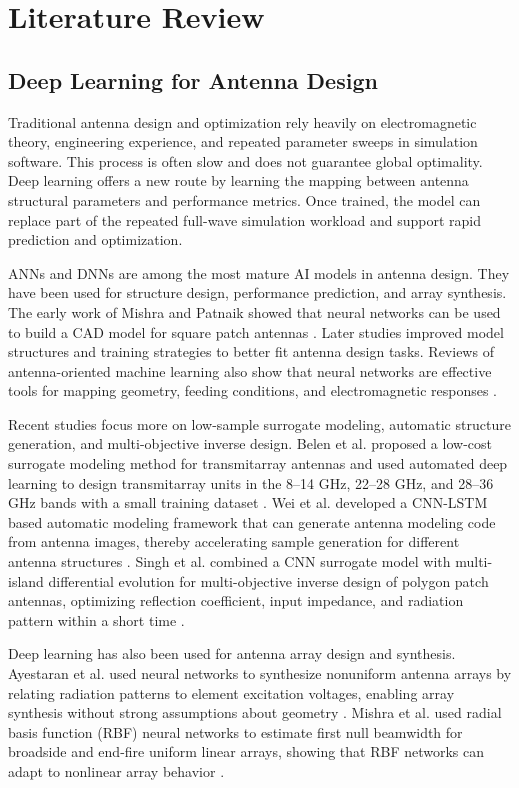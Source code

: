 \documentclass{article}
\begin{document}
\section{Literature Review}

\subsection{Deep Learning for Antenna Design}

Traditional antenna design and optimization rely heavily on electromagnetic theory, engineering experience, and repeated parameter sweeps in simulation software. This process is often slow and does not guarantee global optimality. Deep learning offers a new route by learning the mapping between antenna structural parameters and performance metrics. Once trained, the model can replace part of the repeated full-wave simulation workload and support rapid prediction and optimization.

ANNs and DNNs are among the most mature AI models in antenna design. They have been used for structure design, performance prediction, and array synthesis. The early work of Mishra and Patnaik showed that neural networks can be used to build a CAD model for square patch antennas \cite{mishra1998square}. Later studies improved model structures and training strategies to better fit antenna design tasks. Reviews of antenna-oriented machine learning also show that neural networks are effective tools for mapping geometry, feeding conditions, and electromagnetic responses \cite{misilmani2020review,feng2022ann}.

Recent studies focus more on low-sample surrogate modeling, automatic structure generation, and multi-objective inverse design. Belen et al. proposed a low-cost surrogate modeling method for transmitarray antennas and used automated deep learning to design transmitarray units in the 8--14 GHz, 22--28 GHz, and 28--36 GHz bands with a small training dataset \cite{belen2023transmitarray}. Wei et al. developed a CNN-LSTM based automatic modeling framework that can generate antenna modeling code from antenna images, thereby accelerating sample generation for different antenna structures \cite{wei2023cnn}. Singh et al. combined a CNN surrogate model with multi-island differential evolution for multi-objective inverse design of polygon patch antennas, optimizing reflection coefficient, input impedance, and radiation pattern within a short time \cite{singh2024polygon}.

Deep learning has also been used for antenna array design and synthesis. Ayestaran et al. used neural networks to synthesize nonuniform antenna arrays by relating radiation patterns to element excitation voltages, enabling array synthesis without strong assumptions about geometry \cite{ayestaran2007nonuniform}. Mishra et al. used radial basis function (RBF) neural networks to estimate first null beamwidth for broadside and end-fire uniform linear arrays, showing that RBF networks can adapt to nonlinear array behavior \cite{mishra2015rbf}.
\end{document}
